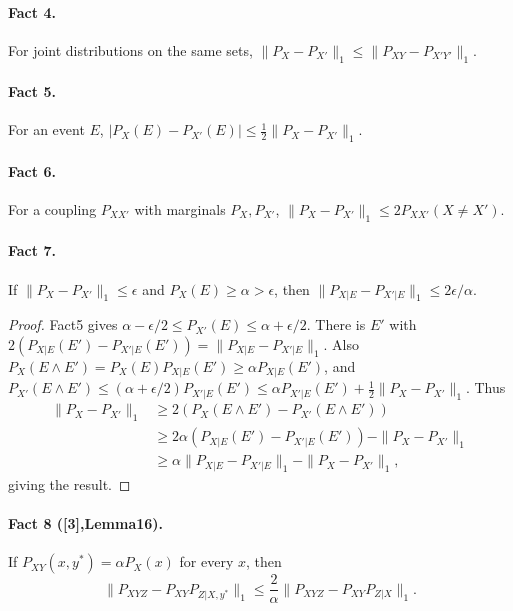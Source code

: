 \documentclass[10pt,a4paper]{article}
\begin{document}
\paragraph{Fact 4.} For joint distributions on the same sets, $\|P_X-P_{X'}\|_1\le\|P_{XY}-P_{X'Y'}\|_1$.
\paragraph{Fact 5.} For an event $E$, $|P_X(E)-P_{X'}(E)|\le\frac12\|P_X-P_{X'}\|_1$.
\paragraph{Fact 6.} For a coupling $P_{XX'}$ with marginals $P_X,P_{X'}$, $\|P_X-P_{X'}\|_1\le2P_{XX'}(X\ne X')$.
\paragraph{Fact 7.} If $\|P_X-P_{X'}\|_1\le\epsilon$ and $P_X(E)\ge\alpha>\epsilon$, then $\|P_{X|E}-P_{X'|E}\|_1\le2\epsilon/\alpha$.
\begin{proof}Fact5 gives $\alpha-\epsilon/2\le P_{X'}(E)\le\alpha+\epsilon/2$. There is $E'$ with $2(P_{X|E}(E')-P_{X'|E}(E'))=\|P_{X|E}-P_{X'|E}\|_1$. Also $P_X(E\wedge E')=P_X(E)P_{X|E}(E')\ge\alpha P_{X|E}(E')$, and $P_{X'}(E\wedge E')\le(\alpha+\epsilon/2)P_{X'|E}(E')\le\alpha P_{X'|E}(E')+\frac12\|P_X-P_{X'}\|_1$. Thus
\begin{align*}\|P_X-P_{X'}\|_1&\ge2(P_X(E\wedge E')-P_{X'}(E\wedge E'))\\&\ge2\alpha(P_{X|E}(E')-P_{X'|E}(E'))-\|P_X-P_{X'}\|_1\\&\ge\alpha\|P_{X|E}-P_{X'|E}\|_1-\|P_X-P_{X'}\|_1,\end{align*}
giving the result.\end{proof}
\paragraph{Fact 8 ([3],Lemma16).} If $P_{XY}(x,y^*)=\alpha P_X(x)$ for every $x$, then
\[\|P_{XYZ}-P_{XY}P_{Z|X,y^*}\|_1\le\frac2\alpha\|P_{XYZ}-P_{XY}P_{Z|X}\|_1.\]
\end{document}
